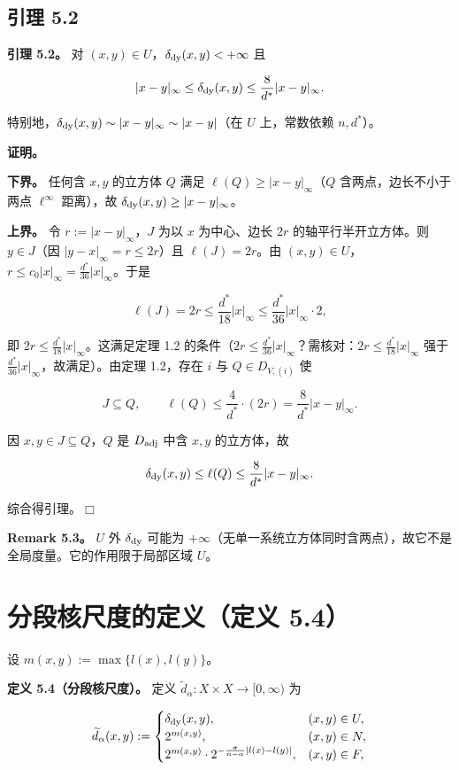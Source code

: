 \documentclass[a4paper,11pt,openany]{ctexbook}
\numberwithin{equation}{chapter}
\numberwithin{figure}{chapter}
\numberwithin{table}{chapter}
\begin{document}
\subsection{引理 5.2}

\textbf{引理 5.2。} 对 $(x,y)\in U$，$\delta_{\rm dy}(x,y)<+\infty$ 且

$$|x-y|_\infty\le\delta_{\rm dy}(x,y)\le\frac8{d^*}|x-y|_\infty.$$

特别地，$\delta_{\rm dy}(x,y)\sim|x-y|_\infty\sim|x-y|$（在 $U$ 上，常数依赖 $n,d^*$）。

\textbf{证明。}

\textbf{下界。} 任何含 $x,y$ 的立方体 $Q$ 满足 $\ell(Q)\ge|x-y|_\infty$（$Q$ 含两点，边长不小于两点 $\ell^\infty$ 距离），故 $\delta_{\rm dy}(x,y)\ge|x-y|_\infty$。

\textbf{上界。} 令 $r:=|x-y|_\infty$，$J$ 为以 $x$ 为中心、边长 $2r$ 的轴平行半开立方体。则 $y\in J$（因 $|y-x|_\infty=r\le2r$）且 $\ell(J)=2r$。由 $(x,y)\in U$，$r\le c_0|x|_\infty=\frac{d^*}{36}|x|_\infty$。于是

$$\ell(J)=2r\le\frac{d^*}{18}|x|_\infty\le\frac{d^*}{36}|x|_\infty\cdot2,$$

即 $2r\le\frac{d^*}{18}|x|_\infty$。这满足定理 1.2 的条件（$2r\le\frac{d^*}{36}|x|_\infty$？需核对：$2r\le\frac{d^*}{18}|x|_\infty$ 强于 $\frac{d^*}{36}|x|_\infty$，故满足）。由定理 1.2，存在 $i$ 与 $Q\in D_{V,(i)}$ 使

$$J\subseteq Q,\qquad \ell(Q)\le\frac4{d^*}\cdot(2r)=\frac8{d^*}|x-y|_\infty.$$

因 $x,y\in J\subseteq Q$，$Q$ 是 $D_{\rm adj}$ 中含 $x,y$ 的立方体，故

$$\delta_{\rm dy}(x,y)\le\ell(Q)\le\frac8{d^*}|x-y|_\infty.$$

综合得引理。$\Box$

\textbf{Remark 5.3。} $U$ 外 $\delta_{\rm dy}$ 可能为 $+\infty$（无单一系统立方体同时含两点），故它不是全局度量。它的作用限于局部区域 $U$。

\section{分段核尺度的定义（定义 5.4）}

设 $m(x,y):=\max\{l(x),l(y)\}$。

\textbf{定义 5.4（分段核尺度）。} 定义 $\widetilde d_\alpha:X\times X\to[0,\infty)$ 为

$$\widetilde d_\alpha(x,y):=\begin{cases}
\delta_{\rm dy}(x,y), & (x,y)\in U,\\
2^{m(x,y)}, & (x,y)\in N,\\
2^{m(x,y)}\cdot 2^{-\frac{\sigma}{n-\alpha}|l(x)-l(y)|}, & (x,y)\in F,
\end{cases}$$
\end{document}

